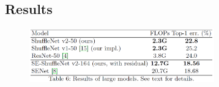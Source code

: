 \subsection{Results}
\begin{figure}[H]
    \centering
    \includegraphics[width=8cm]{images/models/shufflenetv2_res.png}
    \label{fig:shufflenetv2_res}
\end{figure}